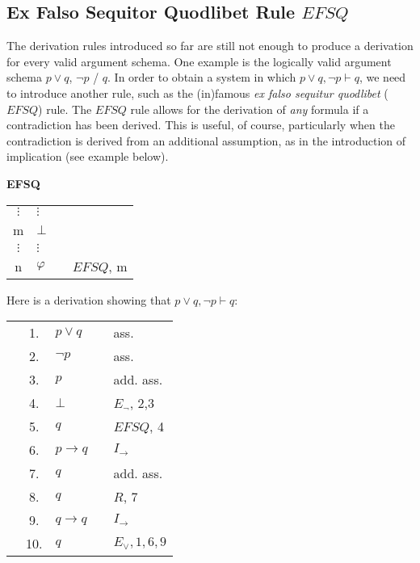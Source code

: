 \documentclass[nobib,nofonts]{tufte-handout}
\newcommand{\EFSQ}{\ensuremath{\mathit{EFSQ}}\xspace}
\begin{document}
\subsection{Ex Falso Sequitor Quodlibet Rule $\EFSQ$}

The derivation rules introduced so far are still not enough to produce a derivation for every valid argument schema.
One example is the logically valid argument schema $p \vee q$, $\neg p$ / $q$.
In order to obtain a system in which $p \vee q, \neg p \vdash q$, we need to introduce another rule, such as the (in)famous \emph{ex falso sequitur quodlibet} (\EFSQ) rule.
The \EFSQ rule allows for the derivation of \emph{any} formula if a contradiction has been derived.
This is useful, of course, particularly when the contradiction is derived from an additional assumption, as in the introduction of implication (see example below).

\bigskip
\noindent \colorbox{mygray!60}{\centering
  \begin{minipage}[t]{0.35\linewidth}
    \textbf{EFSQ}
  \end{minipage}
  \begin{minipage}[t]{0.55\linewidth}
    \begin{tabular}{clcl}
            $\vdots$ & $\vdots$  & \\
      m              & $\bot$ &  \\
            $\vdots$ & $\vdots$  & \\
      n              & $\varphi$    & & $\EFSQ$, m
    \end{tabular}
  \end{minipage}
}
\bigskip

Here is a derivation showing that $p \vee q, \neg p \vdash q$:

\begin{tabular}{cclcl}
                     & 1. & $p \vee   q$                        & & ass.  \\
                     & 2. & $\neg p$                            & & ass.  \\
  \cline{1-2} \vline & 3. & $p$                                 & & add. ass.  \\
  \vline             & 4. & $\bot$                              & & $E_{\neg}$, 2,3 \\
  \vline             & 5. & $q$                                 & & $\EFSQ$, 4\\ \hline
                     & 6. & $p \rightarrow q $ & & $I_{\rightarrow}$ \\
  \cline{1-2} \vline & 7. & $q$                                 & & add. ass.  \\
  \vline             & 8. & $q$                                 & & $R$, 7\\ \hline
                     & 9. & $q \rightarrow q $ & & $I_{\rightarrow}$ \\
                     & 10. & $q$ & & $E_{\vee}, 1,6,9$ \\
\end{tabular}
\end{document}
